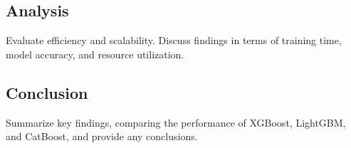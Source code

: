 \documentclass[
]{article}
\begin{document}
\subsection{Analysis}\label{analysis}

Evaluate efficiency and scalability. Discuss findings in terms of
training time, model accuracy, and resource utilization.

\subsection{Conclusion}\label{conclusion}

Summarize key findings, comparing the performance of XGBoost, LightGBM,
and CatBoost, and provide any conclusions.
\end{document}
